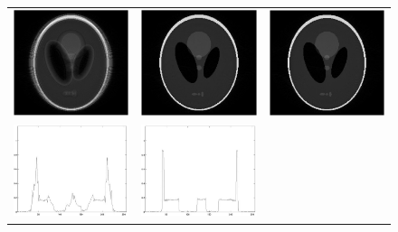 \documentclass[journal]{IEEEtran}
\numberwithin{equation}{section}
\numberwithin{table}{section}
\numberwithin{figure}{section}
\begin{document}
\begin{figure}[ht!]
\centering
\begin{tabular}{ccc}
\includegraphics[width=5.5cm]{pics/phantom_gridding_iter=1.jpg} &
\includegraphics[width=5.5cm]{pics/phantom_nnfft_iter=1.jpg}&
\includegraphics[width=5.5cm]{pics/phantom_3d_iter=1.jpg}\\
\includegraphics[width=5.5cm]{pics/phantom_gridding_iter=1row.jpg} &
\includegraphics[width=5.5cm]{pics/phantom_nnfft_iter=1row.jpg}&

\end{tabular}
\end{figure}
\end{document}
